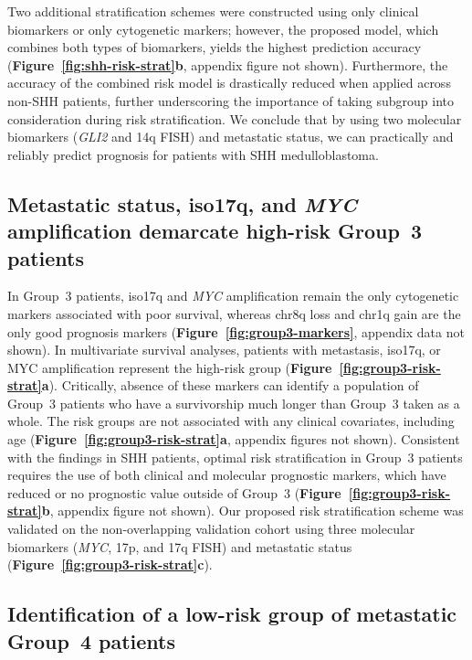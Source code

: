\documentclass[11pt,letterpaper]{article}
\theoremstyle{definition}
\newcommand{\citefig}[1]{\textbf{Figure~\ref{fig:#1}}}
\begin{document}
Two additional stratification schemes were constructed using only clinical biomarkers or only cytogenetic markers; however, the proposed model, which combines both types of biomarkers, yields the highest prediction accuracy (\citefig{shh-risk-strat}\textbf{b}, appendix figure not shown). Furthermore, the accuracy of the combined risk model is drastically reduced when applied across non-SHH patients, further underscoring the importance of taking subgroup into consideration during risk stratification. We conclude that by using two molecular biomarkers (\emph{GLI2} and 14q FISH) and metastatic status, we can practically and reliably predict prognosis for patients with SHH medulloblastoma.

\subsection{Metastatic status, iso17q, and \emph{MYC} amplification demarcate high-risk Group~3 patients}

In Group~3 patients, iso17q and \emph{MYC} amplification remain the only cytogenetic markers associated with poor survival, whereas chr8q loss and chr1q gain are the only good prognosis markers (\citefig{group3-markers}, appendix data not shown). In multivariate survival analyses, patients with metastasis, iso17q, or MYC amplification represent the high-risk group (\citefig{group3-risk-strat}\textbf{a}). Critically, absence of these markers can identify a population of Group~3 patients who have a survivorship much longer than Group~3 taken as a whole. The risk groups are not associated with any clinical covariates, including age (\citefig{group3-risk-strat}\textbf{a}, appendix figures not shown). Consistent with the findings in SHH patients, optimal risk stratification in Group~3 patients requires the use of both clinical and molecular prognostic markers, which have reduced or no prognostic value outside of Group~3 (\citefig{group3-risk-strat}\textbf{b}, appendix figure not shown). Our proposed risk stratification scheme was validated on the non-overlapping validation cohort using three molecular biomarkers (\emph{MYC}, 17p, and 17q FISH) and metastatic status (\citefig{group3-risk-strat}\textbf{c}).

\subsection{Identification of a low-risk group of metastatic Group~4 patients}
\end{document}
